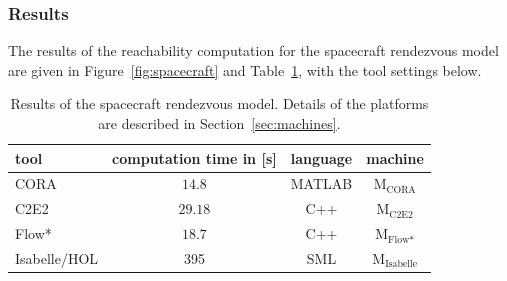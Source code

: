\documentclass[EPiC]{easychair}
\begin{document}


\subsubsection{Results}

The results of the reachability computation for the spacecraft rendezvous model are given in Figure~\ref{fig:spacecraft} and Table~\ref{tab:compTimes:spacecraft}, with the tool settings below.

\begin{table}[t]
	\setlength{\tabcolsep}{4pt}
	\renewcommand{\arraystretch}{1.2}
	\centering
	\caption{Results of the spacecraft rendezvous model. Details of the platforms are described in Section~\ref{sec:machines}.}
	\begin{tabular}[c]{lccc}
	\hline
		 \textbf{tool} & \textbf{computation time in [s]} & \textbf{language} & \textbf{machine} \\
		 \hline
         CORA & $14.8$ & MATLAB & M$_{\text{CORA}}$ \\
         {C2E2} & {$29.18$} & {C++} & {M$_{\text{C2E2}}$} \\
         Flow* & $18.7$ & C++ & M$_{\text{Flow*}}$ \\
         Isabelle/HOL & 395 & SML & M$_{\text{Isabelle}}$ \\
		 \hline
	\end{tabular}
	\label{tab:compTimes:spacecraft}
\end{table}
\end{document}
